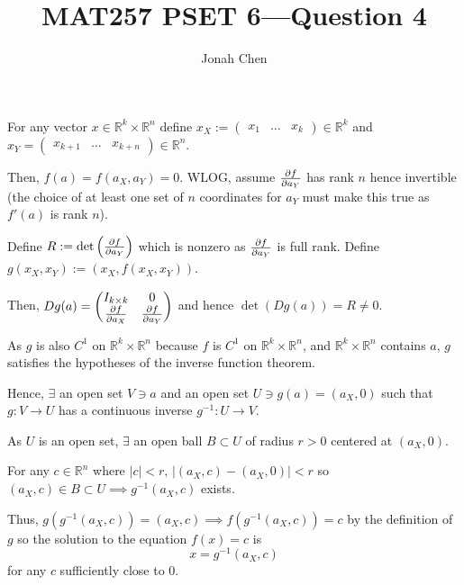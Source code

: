 \documentclass{exam}
\title{MAT257 PSET 6---Question 4}
\author{Jonah Chen}
\numberwithin{equation}{section}
\newcommand{\R}{\mathbb{R}}
\begin{document}
    \sffamily
    \maketitle
    For any vector $x\in\R^k\times\R^n$ define $x_X:=\begin{pmatrix}
        x_1&\dots&x_k
    \end{pmatrix}\in\R^k$ and $x_Y=\begin{pmatrix}
        x_{k+1}&\dots&x_{k+n}
    \end{pmatrix}\in\R^n$. 
    
    Then, $f(a)=f(a_X,a_Y)=0$. WLOG, assume $\partialderivative{f}{a_Y}$ has rank $n$ hence invertible (the choice of at least one set of $n$ coordinates for $a_Y$ must make this true as $f'(a)$ is rank $n$). 
    
    Define $R:=\det\left(\partialderivative{f}{a_Y}\right)$ which is nonzero as $\partialderivative{f}{a_Y}$ is full rank. Define $g(x_X,x_Y):=(x_X,f(x_X,x_Y))$. 
    
    Then, $Dg(a)=\begin{pmatrix}
        I_{k\times k} & 0\\
        \partialderivative{f}{a_X}&\partialderivative{f}{a_Y}
    \end{pmatrix}$ and hence $\det (Dg(a))=R\neq0$.

    As $g$ is also $C^1$ on $\R^k\times\R^n$ because $f$ is $C^1$ on $\R^k\times\R^n$, and $\R^k\times\R^n$ contains $a$, $g$ satisfies the hypotheses of the inverse function theorem.
    
    Hence, $\exists$ an open set $V\ni a$ and an open set $U\ni g(a)=(a_X,0)$ such that $g:V\to U$ has a continuous inverse $g^{-1}:U\to V$. 
    
    As $U$ is an open set, $\exists$ an open ball $B\subset U$ of radius $r>0$ centered at $(a_X,0)$.

    For any $c\in\R^n$ where $|c|<r,\, |(a_X,c)-(a_X,0)|<r$ so $(a_X,c)\in B\subset U\implies g^{-1}(a_X,c)$ exists. 
    
    Thus, $g(g^{-1}(a_X,c))=(a_X,c)\implies f(g^{-1}(a_X,c))=c$ by the definition of $g$ so the solution to the equation $f(x)=c$ is $$x=g^{-1}(a_X,c)$$
    for any $c$ sufficiently close to $0$.
\end{document}
